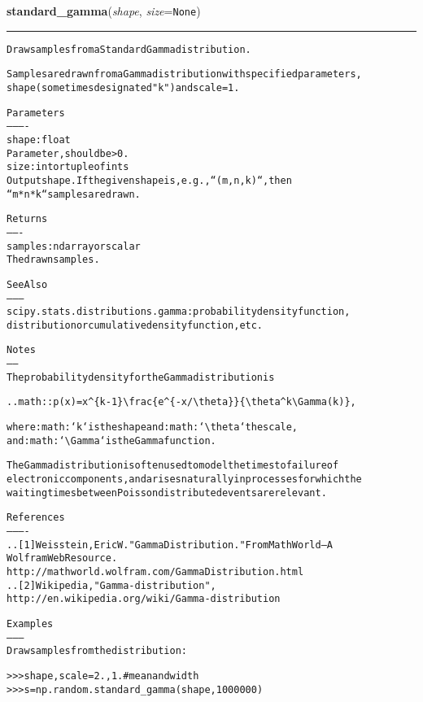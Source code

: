 \hspace{.8\funcindent}\begin{boxedminipage}{\funcwidth}

    \raggedright \textbf{standard\_gamma}(\textit{shape}, \textit{size}={\tt None})

    \vspace{-1.5ex}

    \rule{\textwidth}{0.5\fboxrule}
\setlength{\parskip}{2ex}
\begin{alltt}
Draw samples from a Standard Gamma distribution.

Samples are drawn from a Gamma distribution with specified parameters,
shape (sometimes designated "k") and scale=1.

Parameters
----------
shape : float
    Parameter, should be {\textgreater} 0.
size : int or tuple of ints
    Output shape.  If the given shape is, e.g., ``(m, n, k)``, then
    ``m * n * k`` samples are drawn.

Returns
-------
samples : ndarray or scalar
    The drawn samples.

See Also
--------
scipy.stats.distributions.gamma : probability density function,
    distribution or cumulative density function, etc.

Notes
-----
The probability density for the Gamma distribution is

.. math:: p(x) = x{\textasciicircum}\{k-1\}{\textbackslash}frac\{e{\textasciicircum}\{-x/{\textbackslash}theta\}\}\{{\textbackslash}theta{\textasciicircum}k{\textbackslash}Gamma(k)\},

where :math:`k` is the shape and :math:`{\textbackslash}theta` the scale,
and :math:`{\textbackslash}Gamma` is the Gamma function.

The Gamma distribution is often used to model the times to failure of
electronic components, and arises naturally in processes for which the
waiting times between Poisson distributed events are relevant.

References
----------
.. [1] Weisstein, Eric W. "Gamma Distribution." From MathWorld--A
       Wolfram Web Resource.
       http://mathworld.wolfram.com/GammaDistribution.html
.. [2] Wikipedia, "Gamma-distribution",
       http://en.wikipedia.org/wiki/Gamma-distribution

Examples
--------
Draw samples from the distribution:

{\textgreater}{\textgreater}{\textgreater} shape, scale = 2., 1. \# mean and width
{\textgreater}{\textgreater}{\textgreater} s = np.random.standard\_gamma(shape, 1000000)


\end{alltt}
\end{boxedminipage}

